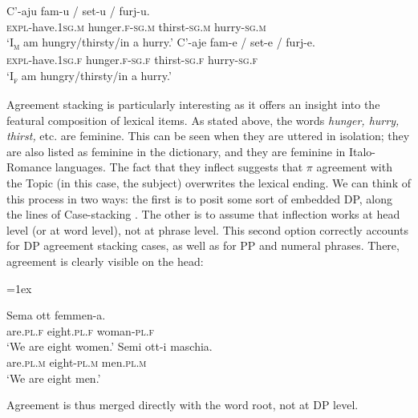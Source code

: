 \documentclass[output=paper
,modfonts
,nonflat]{langsci/langscibook}
\begin{document}
\begin{exe} 
	\ex  \xlist
	\ex 
	\gll C'-aju     fam-u / set-u / furj-u.\\
	\textsc{expl}{}-have.\textsc{1sg.m}  hunger.\textsc{f-sg.m} {} thirst-\textsc{sg.m} {} hurry-\textsc{sg.m}\\
	\glt`I\textsc{\textsubscript{m}} am hungry/thirsty/in a hurry.'
	\ex
	\gll  C'-aje     fam-e / set-e / furj-e.\\
	\textsc{expl}{}-have.\textsc{1sg.f} hunger.\textsc{f-sg.f} {} thirst-\textsc{sg.f} {} hurry-\textsc{sg.f}\\ 
	\glt `I\textsc{\textsubscript{f}} am hungry/thirsty/in a hurry.'
	\endxlist
\end{exe}
Agreement stacking is particularly interesting as it offers an insight into the featural composition of lexical items. As stated above, the words \textit{hunger, hurry, thirst,} etc. are feminine. This can be seen when they are uttered in isolation; they are also listed as feminine in the dictionary, and they are feminine in Italo-Romance languages. The fact that they inflect suggests that $\pi $ agreement with the Topic (in this case, the subject) overwrites the lexical ending. We can think of this process in two ways: the first is to posit some sort of embedded DP, along the lines of Case-stacking \citep{McCreight1988, Nordlinger1998, Merchant2006, Richards2013, Pesetsky2013}. The other is to assume that inflection works at head level (or at word level), not at phrase level. This second option correctly accounts for DP agreement stacking cases, as well as for PP and numeral phrases. There, agreement is clearly visible on the head: 

\begin{exe} 
	\ex \citet[30]{Lambertelli2003} \xlist
	{\multicolsep=1ex\begin{multicols}{2}\ex 
	\gll Sema   ott\footnotemark  {}  femmen-a.\\ 
	are.\textsc{pl.f} eight.\textsc{pl.f} woman-\textsc{pl.f}\\
	\glt`We are eight women.'
	\ex
	\gll Semi     ott-i     maschia.\\
	are.\textsc{pl.m} eight-\textsc{pl.m} men.\textsc{pl.m}\\ 
	\glt `We are eight men.'\end{multicols}}
	\endxlist
\end{exe}
Agreement is thus merged directly with the word root, not at DP level.
\end{document}
